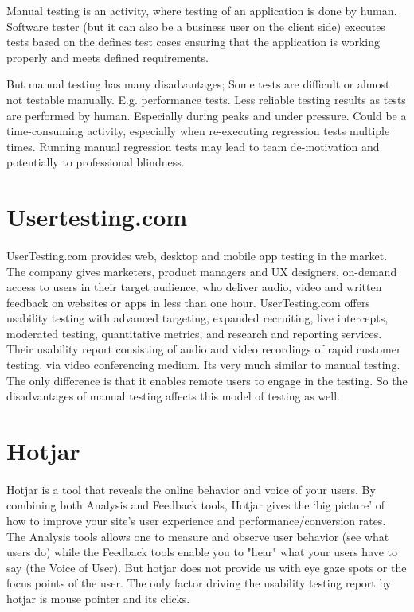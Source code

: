 \documentclass[hidelinks,12pt,a4paper,final]{extreport}
\begin{document}
Manual testing is an activity, where testing of an application is done by human. Software tester (but it can also be a business user on the client side) executes tests based on the defines test cases ensuring that the application is working properly and meets defined requirements.

But manual testing has many disadvantages; 
Some tests are difficult or almost not testable manually. E.g. performance tests.
Less reliable testing results as tests are performed by human. Especially during peaks and under pressure.
Could be a time-consuming activity, especially when re-executing regression tests multiple times.
Running manual regression tests may lead to team de-motivation and potentially to professional blindness.

\section{Usertesting.com}
\paragraph{}
UserTesting.com provides web, desktop and mobile app testing in the market. The company gives marketers, product managers and UX designers, on-demand access to users in their target audience, who deliver audio, video and written feedback on websites or apps in less than one hour. UserTesting.com offers usability testing with advanced targeting, expanded recruiting, live intercepts, moderated testing, quantitative metrics, and research and reporting services.
Their usability report consisting of audio and video recordings of rapid customer testing, via video conferencing medium. Its very much similar to manual testing. The only difference is that it enables remote users to engage in the testing. So the disadvantages of manual testing affects this model of testing as well.

\section{Hotjar}
\paragraph{}
Hotjar is a tool that reveals the online behavior and voice of your users. By combining both Analysis and Feedback tools, Hotjar gives the ‘big picture’ of how to improve your site's user experience and performance/conversion rates.
The Analysis tools allows one to measure and observe user behavior (see what users do) while the Feedback tools enable you to "hear" what your users have to say (the Voice of User).
But hotjar does not provide us with eye gaze spots or the focus points of the user. The only factor driving the usability testing report by hotjar is mouse pointer and its clicks.
\end{document}
